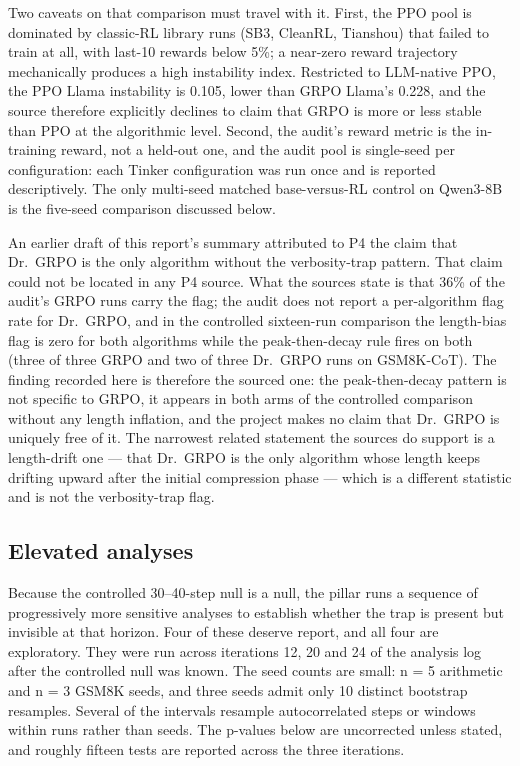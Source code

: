 \documentclass[12pt,a4paper]{report}
\begin{document}
Two caveats on that comparison must travel with it. First, the PPO pool
is dominated by classic-RL library runs (SB3, CleanRL, Tianshou) that
failed to train at all, with last-10 rewards below 5\%; a near-zero
reward trajectory mechanically produces a high instability index.
Restricted to LLM-native PPO, the PPO Llama instability is 0.105, lower
than GRPO Llama's 0.228, and the source therefore explicitly declines to
claim that GRPO is more or less stable than PPO at the algorithmic
level. Second, the audit's reward metric is the in-training reward, not
a held-out one, and the audit pool is single-seed per configuration:
each Tinker configuration was run once and is reported descriptively.
The only multi-seed matched base-versus-RL control on Qwen3-8B is the
five-seed comparison discussed below.

An earlier draft of this report's summary attributed to P4 the claim
that Dr.~GRPO is the only algorithm without the verbosity-trap pattern.
That claim could not be located in any P4 source. What the sources state
is that 36\% of the audit's GRPO runs carry the flag; the audit does not
report a per-algorithm flag rate for Dr.~GRPO, and in the controlled
sixteen-run comparison the length-bias flag is zero for both algorithms
while the peak-then-decay rule fires on both (three of three GRPO and
two of three Dr.~GRPO runs on GSM8K-CoT). The finding recorded here is
therefore the sourced one: the peak-then-decay pattern is not specific
to GRPO, it appears in both arms of the controlled comparison without
any length inflation, and the project makes no claim that Dr.~GRPO is
uniquely free of it. The narrowest related statement the sources do
support is a length-drift one --- that Dr.~GRPO is the only algorithm
whose length keeps drifting upward after the initial compression phase
--- which is a different statistic and is not the verbosity-trap flag.

\subsection{Elevated analyses}\label{elevated-analyses}

Because the controlled 30--40-step null is a null, the pillar runs a
sequence of progressively more sensitive analyses to establish whether
the trap is present but invisible at that horizon. Four of these deserve
report, and all four are exploratory. They were run across iterations
12, 20 and 24 of the analysis log after the controlled null was known.
The seed counts are small: n = 5 arithmetic and n = 3 GSM8K seeds, and
three seeds admit only 10 distinct bootstrap resamples. Several of the
intervals resample autocorrelated steps or windows within runs rather
than seeds. The p-values below are uncorrected unless stated, and
roughly fifteen tests are reported across the three iterations.
\end{document}
